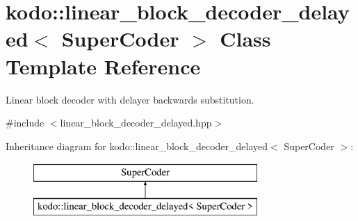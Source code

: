 \hypertarget{classkodo_1_1linear__block__decoder__delayed}{\section{kodo\-:\-:linear\-\_\-block\-\_\-decoder\-\_\-delayed$<$ Super\-Coder $>$ Class Template Reference}
\label{classkodo_1_1linear__block__decoder__delayed}
}


Linear block decoder with delayer backwards substitution.  




{\ttfamily \#include $<$linear\-\_\-block\-\_\-decoder\-\_\-delayed.\-hpp$>$}

Inheritance diagram for kodo\-:\-:linear\-\_\-block\-\_\-decoder\-\_\-delayed$<$ Super\-Coder $>$\-:\begin{figure}[H]
\begin{center}
\leavevmode
\includegraphics[height=2.000000cm]{classkodo_1_1linear__block__decoder__delayed}
\end{center}
\end{figure}

